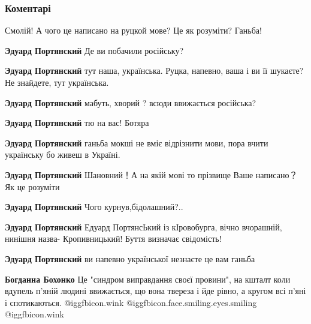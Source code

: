  
 
 
 
 
\subsubsection{Коментарі}
\label{sec:14_09_2021.fb.smolij_andrij.1.apeljacia_zakon_mova_tv.cmt}

\begin{itemize} %
Смолій! А чого це написано на руцкой мове? Це як розуміти? Ганьба!

\begin{itemize} %
\textbf{Эдуард Портянский} Де ви побачили російську?

\textbf{Эдуард Портянский} тут наша, українська. Руцка, напевно, ваша і ви її шукаєте? Не знайдете, тут українська.

\textbf{Эдуард Портянский} мабуть, хворий ? всюди ввижається російська?

\textbf{Эдуард Портянский} тю на вас! Ботяра

\textbf{Эдуард Портянский} ганьба мокші не вміє відрізнити мови, пора вчити українську бо живеш в Україні.

\textbf{Эдуард Портянский} Шановний！А на якій мові то прізвище Ваше
написано？Як це розуміти

\textbf{Эдуард Портянский} Чого курнув,бідолашний?..

\textbf{Эдуард Портянский} Едуард ПортянсЬкий із кІровобурга, вічно вчорашній, нинішня назва- Кропивницький! Буття визначає свідомість!

\textbf{Эдуард Портянский} ви напевно української незнаєте це вам ганьба

\textbf{Богданна Бохонко} Це "синдром виправдання своєї провини", на кшталт коли вдупель п'яній людині ввижається, що вона твереза і йде рівно, а кругом всі п'яні і спотикаються.  @igg{fbicon.wink}  @igg{fbicon.face.smiling.eyes.smiling}  @igg{fbicon.wink} 


\end{itemize}
\end{itemize}
